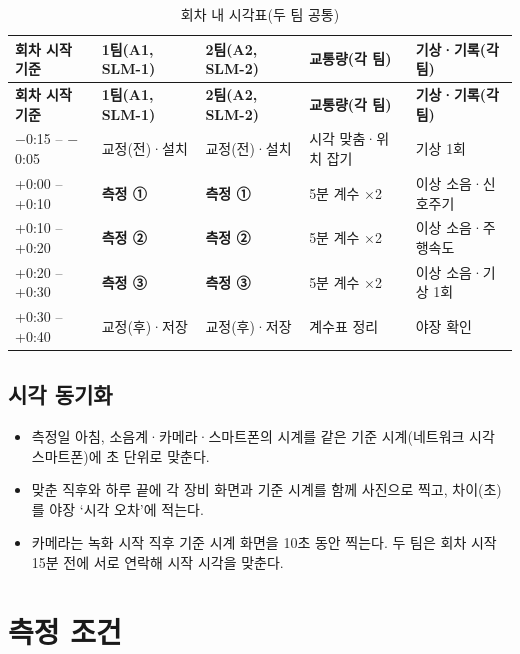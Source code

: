 \documentclass[10.5pt,a4paper]{article}
\newcommand{\hd}[1]{\cellcolor{headfill}\textbf{\sffamily #1}}
\begin{document}
\begin{longtable}{>{\centering\arraybackslash}p{}>{\centering\arraybackslash}p{}>{\centering\arraybackslash}p{}>{\centering\arraybackslash}p{}>{\centering\arraybackslash}p{}}
\caption{회차 내 시각표(두 팀 공통)}\\
\toprule
\hd{회차 시작 기준} & \hd{1팀(A1, SLM-1)} & \hd{2팀(A2, SLM-2)} & \hd{교통량(각 팀)} & \hd{기상·기록(각 팀)} \\ \midrule
\endfirsthead
\toprule
\hd{회차 시작 기준} & \hd{1팀(A1, SLM-1)} & \hd{2팀(A2, SLM-2)} & \hd{교통량(각 팀)} & \hd{기상·기록(각 팀)} \\ \midrule
\endhead
\bottomrule
\endlastfoot
$-$0:15 -- $-$0:05 & 교정(전)·설치 & 교정(전)·설치 & 시각 맞춤·위치 잡기 & 기상 1회 \\ \midrule
+0:00 -- +0:10 & \cellcolor{team1}{}\textbf{측정 ①} & \cellcolor{team2}{}\textbf{측정 ①} & 5분 계수 $\times$2 & 이상 소음·신호주기 \\ \midrule
+0:10 -- +0:20 & \cellcolor{team1}{}\textbf{측정 ②} & \cellcolor{team2}{}\textbf{측정 ②} & 5분 계수 $\times$2 & 이상 소음·주행속도 \\ \midrule
+0:20 -- +0:30 & \cellcolor{team1}{}\textbf{측정 ③} & \cellcolor{team2}{}\textbf{측정 ③} & 5분 계수 $\times$2 & 이상 소음·기상 1회 \\ \midrule
+0:30 -- +0:40 & 교정(후)·저장 & 교정(후)·저장 & 계수표 정리 & 야장 확인 \\
\end{longtable}
\normalsize
{}\subsection{시각 동기화}
\begin{itemize}
\item 측정일 아침, 소음계·카메라·스마트폰의 시계를 같은 기준 시계(네트워크 시각 스마트폰)에 초 단위로 맞춘다.
\item 맞춘 직후와 하루 끝에 각 장비 화면과 기준 시계를 함께 사진으로 찍고, 차이(초)를 야장 `시각 오차'에 적는다.
\item 카메라는 녹화 시작 직후 기준 시계 화면을 10초 동안 찍는다. 두 팀은 회차 시작 15분 전에 서로 연락해 시작 시각을 맞춘다.
\end{itemize}
\section{측정 조건}
\end{document}
